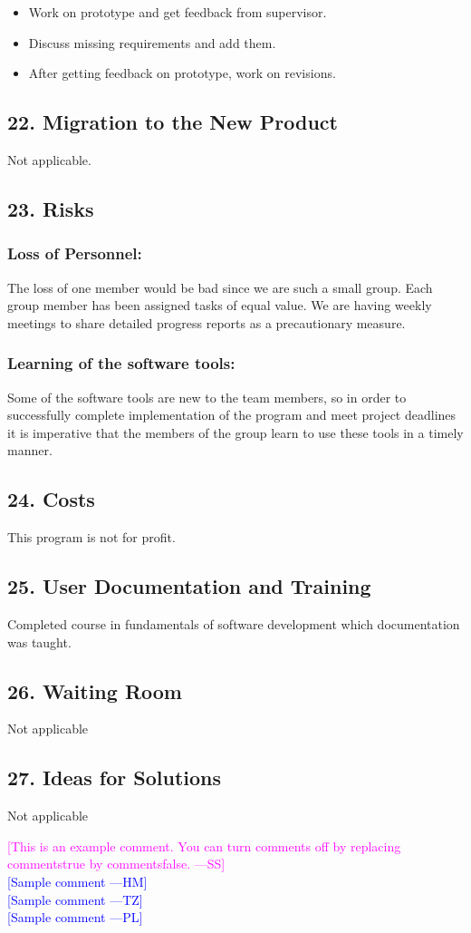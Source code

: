 \documentclass[titlepage]{article}
\newcommand{\authornote}[3]{\textcolor{#1}{[#3 ---#2]}}
\newcommand{\authornote}[3]{}
\newcommand{\wss}[1]{\authornote{magenta}{SS}{#1}}
\newcommand{\hm}[1]{\authornote{blue}{HM}{#1}} %
\newcommand{\tz}[1]{\authornote{blue}{TZ}{#1}} %
\newcommand{\pl}[1]{\authornote{blue}{PL}{#1}} %
\begin{document}
\begin{itemize}
  \item Work on prototype and get feedback from supervisor.
  \item Discuss missing requirements and add them.
  \item After getting feedback on prototype, work on revisions.
\end{itemize}

\subsection{22. Migration to the New Product }
Not applicable.

\subsection{23. Risks }

\subsubsection*{Loss of Personnel:}The loss of one member would be bad since we are such a small group. Each group member has been assigned tasks of equal value. We are having weekly meetings to share detailed progress reports as a precautionary measure. 

\subsubsection*{Learning of the software tools:} Some of the software tools are new to the team members, so in order to successfully complete implementation of the program and meet project deadlines it is imperative that the members of the group learn to use these tools in a timely manner.

\subsection{24. Costs }
This program is not for profit.

\subsection{25. User Documentation and Training }
Completed course in fundamentals of software development which documentation was taught.

\subsection{26. Waiting Room}
Not applicable 

\subsection{27. Ideas for Solutions}
Not applicable



\noindent \wss{This is an example comment.  You can turn comments off by replacing
  commentstrue by commentsfalse.}\\
\hm{Sample comment}\\
\tz{Sample comment}\\
\pl{Sample comment}
\end{document}
